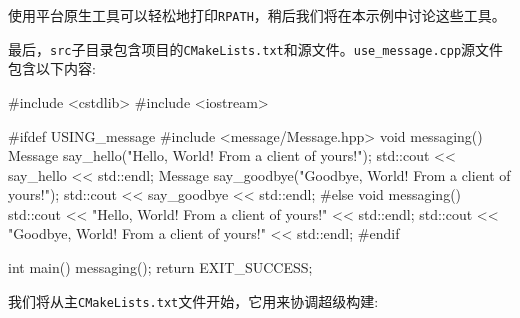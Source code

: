 使用平台原生工具可以轻松地打印\texttt{RPATH}，稍后我们将在本示例中讨论这些工具。

最后，\texttt{src}子目录包含项目的\texttt{CMakeLists.txt}和源文件。\texttt{use\_message.cpp}源文件包含以下内容:

\begin{codebox}[cpp]
#include <cstdlib>
#include <iostream>

#ifdef USING_message
#include <message/Message.hpp>
void messaging()
{
  Message say_hello("Hello, World! From a client of yours!");
  std::cout << say_hello << std::endl;
  Message say_goodbye("Goodbye, World! From a client of yours!");
  std::cout << say_goodbye << std::endl;
}
#else
void messaging()
{
  std::cout << "Hello, World! From a client of yours!" << std::endl;
  std::cout << "Goodbye, World! From a client of yours!" << std::endl;
}
#endif

int main()
{
  messaging();
  return EXIT_SUCCESS;
}
\end{codebox}


我们将从主\texttt{CMakeLists.txt}文件开始，它用来协调超级构建:

